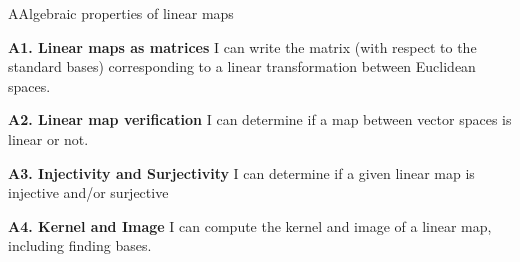 
\begin{module}{A}{Algebraic properties of linear maps}

\begin{moduleStandards}
  \item \textbf{A1. Linear maps as matrices}
         I can write the matrix (with respect to the standard bases) corresponding to a linear transformation between Euclidean spaces.
  \item \textbf{A2. Linear map verification}
        I can determine if a map between vector spaces is linear or not.
  \item \textbf{A3. Injectivity and Surjectivity}
        I can determine if a given linear map is injective and/or surjective
  \item \textbf{A4. Kernel and Image}
        I can compute the kernel and image of a linear map, including finding bases.
\end{moduleStandards}







\end{module}
